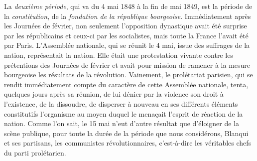 \documentclass[french,twoside]{book} %
\begin{document}
La \emph{deuxième période}, qui va du 4 mai 1848 à la fin de mai 1849, est la période de la \emph{constitution}, de la \emph{fondation de la république bourgeoise}. Immédiatement après les Journées de février, non seulement l’opposition dynastique avait été surprise par les républicains et ceux-ci par les socialistes, mais toute la France l’avait été par Paris. L’Assemblée nationale, qui se réunit le 4 mai, issue des suffrages de la nation, représentait la nation. Elle était une protestation vivante contre les prétentions des Journées de février et avait pour mission de ramener à la mesure bourgeoise les résultats de la révolution. Vainement, le prolétariat parisien, qui se rendit immédiatement compte du caractère de cette Assemblée nationale, tenta, quelques jours après sa réunion, de lui dénier par la violence son droit à l’existence, de la dissoudre, de disperser à nouveau en ses différents éléments constitutifs l’organisme au moyen duquel le menaçait l’esprit de réaction de la nation. Comme l’on sait, le 15 mai n’eut d’autre résultat que d’éloigner de la scène publique, pour toute la durée de la période que nous considérons, Blanqui et ses partisans, les communistes révolutionnaires, c’est-à-dire les véritables chefs du parti prolétarien.\par
\end{document}
